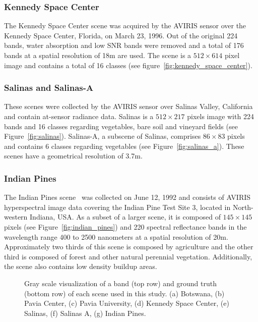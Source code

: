 \documentclass[authoryear,preprint,12pt]{elsarticle}
\begin{document}
\begin{linenumbers}
\subsubsection*{Kennedy Space Center}

The Kennedy Space Center scene was acquired by the AVIRIS sensor over the
Kennedy Space Center, Florida, on March 23, 1996. Out of the original 224
bands, water absorption and low SNR bands were removed and a total of 176
bands at a spatial resolution of 18m are used. The scene is a $512 \times 614$
pixel image and contains a total of 16 classes (see
figure~\ref{fig:kennedy_space_center}).

\subsubsection*{Salinas and Salinas-A}

These scenes were collected by the AVIRIS sensor over Salinas Valley,
California and contain at-sensor radiance data. Salinas is a $512 \times 217$
pixels image with 224 bands and 16 classes regarding vegetables, bare soil and
vineyard fields (see Figure~\ref{fig:salinas}). Salinas-A, a subscene of
Salinas, comprises $86 \times 83$ pixels and contains 6 classes regarding
vegetables (see Figure~\ref{fig:salinas_a}). These scenes have a geometrical
resolution of 3.7m.

\subsubsection*{Indian Pines} 

The Indian Pines scene~\citep{Baumgardner2015} was collected on June 12, 1992
and consists of AVIRIS hyperspectral image data covering the Indian Pine Test
Site 3, located in North-western Indiana, USA. As a subset of a larger scene,
it is composed of $145 \times 145$ pixels (see Figure~\ref{fig:indian_pines})
and 220 spectral reflectance bands in the wavelength range 400 to 2500
nanometers at a spatial resolution of 20m. Approximately two thirds of
this scene is composed by agriculture and the other third is composed of
forest and other natural perennial vegetation. Additionally, the scene also
contains low density buildup areas.

\begin{figure}[H]
	\centering
    \captionsetup{justification=centering}
    \caption{Gray scale visualization of a band (top row) and ground truth
        (bottom row) of each scene used in this study. (a) Botswana, (b) Pavia
        Center, (c) Pavia University, (d) Kennedy Space Center,
        (e) Salinas, (f) Salinas A, (g) Indian Pines.
    \vspace{.25cm}}\label{fig:scenes}
	

\end{figure}
\end{linenumbers}
\end{document}
